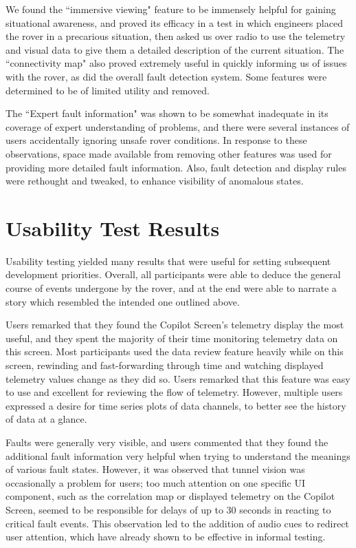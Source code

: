 We found the ``immersive viewing" feature to be immensely helpful for gaining situational awareness, and proved its efficacy in a test in which engineers placed the rover in a precarious situation, then asked us over radio to use the telemetry and visual data to give them a detailed description of the current situation. The ``connectivity map" also proved extremely useful in quickly informing us of issues with the rover, as did the overall fault detection system. Some features were determined to be of limited utility and removed.

The ``Expert fault information" was shown to be somewhat inadequate in its coverage of expert understanding of problems, and there were several instances of users accidentally ignoring unsafe rover conditions. In response to these observations, space made available from removing other features was used for providing more detailed fault information. Also, fault detection and display rules were rethought and tweaked, to enhance visibility of anomalous states.

\section{Usability Test Results}

Usability testing yielded many results that were useful for setting subsequent development priorities. Overall, all participants were able to deduce the general course of events undergone by the rover, and at the end were able to narrate a story which resembled the intended one outlined above.

Users remarked that they found the Copilot Screen's telemetry display the most useful, and they spent the majority of their time monitoring telemetry data on this screen. Most participants used the data review feature heavily while on this screen, rewinding and fast-forwarding through time and watching displayed telemetry values change as they did so. Users remarked that this feature was easy to use and excellent for reviewing the flow of telemetry. However, multiple users expressed a desire for time series plots of data channels, to better see the history of data at a glance.

Faults were generally very visible, and users commented that they found the additional fault information very helpful when trying to understand the meanings of various fault states. However, it was observed that tunnel vision was occasionally a problem for users; too much attention on one specific UI component, such as the correlation map or displayed telemetry on the Copilot Screen, seemed to be responsible for delays of up to 30 seconds in reacting to critical fault events. This observation led to the addition of audio cues to redirect user attention, which have already shown to be effective in informal testing.

